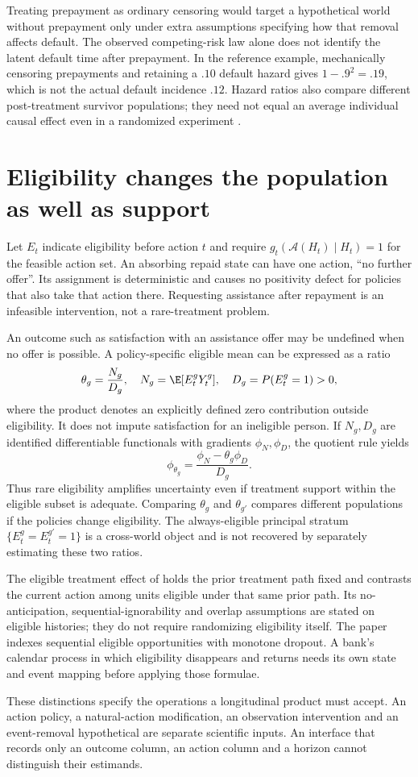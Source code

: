 Treating prepayment as ordinary censoring would target a hypothetical
world without prepayment only under extra assumptions specifying how
that removal affects default. The observed competing-risk law alone
does not identify the latent default time after prepayment. In the
reference example, mechanically censoring prepayments and retaining
a $.10$ default hazard gives $1-.9^2=.19$, which is not the actual
default incidence $.12$. Hazard ratios also compare different
post-treatment survivor populations; they need not equal an average
individual causal effect even in a randomized experiment
\citep[Technical Point 8.1 and Section 17.2]{hernan2020}.



\section{Eligibility changes the population as well as support}
\label{r3:eligibility}
Let $E_t$ indicate eligibility before action $t$ and require
$g_t(\mathcal A(H_t)\mid H_t)=1$ for the feasible action set.
An absorbing repaid state can have one action, ``no further offer''.
Its assignment is deterministic and causes no positivity defect for
policies that also take that action there. Requesting assistance after
repayment is an infeasible intervention, not a rare-treatment problem.

An outcome such as satisfaction with an assistance offer may be
undefined when no offer is possible. A policy-specific eligible mean
can be expressed as a ratio
\[
 \theta_g=\frac{N_g}{D_g},\quad
 N_g=\E[E_t^gY_t^g],\quad D_g=P(E_t^g=1)>0,
\]
where the product denotes an explicitly defined zero contribution
outside eligibility. It does not impute satisfaction for an ineligible
person. If $N_g,D_g$ are identified differentiable functionals with
gradients $\phi_N,\phi_D$, the quotient rule yields
\[
 \phi_{\theta_g}=\frac{\phi_N-\theta_g\phi_D}{D_g}.
\]
Thus rare eligibility amplifies uncertainty even if treatment support
within the eligible subset is adequate. Comparing $\theta_g$ and
$\theta_{g'}$ compares different populations if the policies change
eligibility. The always-eligible principal stratum
$\{E_t^g=E_t^{g'}=1\}$ is a cross-world object and is not recovered
by separately estimating these two ratios.

The eligible treatment effect of \citet[Section 2.2, equation (1)]{selective2025}
holds the prior treatment path fixed and contrasts the current action
among units eligible under that same prior path. Its no-anticipation,
sequential-ignorability and overlap assumptions are stated on eligible
histories; they do not require randomizing eligibility itself. The
paper indexes sequential eligible opportunities with monotone dropout.
A bank's calendar process in which eligibility disappears and returns
needs its own state and event mapping before applying those formulae.

These distinctions specify the operations a longitudinal product must
accept. An action policy, a natural-action modification, an
observation intervention and an event-removal hypothetical are separate
scientific inputs. An interface that records only an outcome column,
an action column and a horizon cannot distinguish their estimands.
